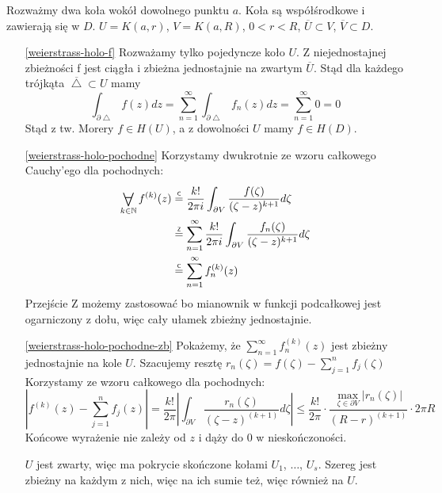 \documentclass[11pt]{article}
\newcommand{\abs}[1]{\left|#1\right|} %
\newcommand{\closure}[1]{\overline{#1}} %
\newcommand{\eqtext}[1]{\overset{\text{\tiny\sffamily #1}}{=}} %
\newcommand{\Forall}[1]{\mathop{\vcenter{\hbox{\LARGE$\forall$}}}\limits_{#1}} %
\theoremstyle{plain}
\theoremstyle{definition}
\theoremstyle{remark}
\let\oldendproof\endproof
\renewenvironment{proof}[1][\proofname]{
  \oldproof[\textsc{\small #1}]
}{\oldendproof}
\begin{document}
\begin{proof}
  Rozważmy dwa koła wokół dowolnego punktu $a$.
  Koła są współśrodkowe i zawierają się w $D$.
  $ U = K(a, r) $, $ V = K(a, R) $, $ 0 < r < R $, $ \closure{U} \subset V $, $ \closure{V} \subset D $.

  \begin{enumerate}

    \item[\ref{weierstrass-holo-f}]
    Rozważamy tylko pojedyncze koło $U$.
    Z niejednostajnej zbieżności f jest ciągła i zbieżna jednostajnie na zwartym $ \closure{U} $.
    Stąd dla każdego trójkąta $ \closure{\bigtriangleup} \subset U $ mamy
    $$
      \int_{\partial \bigtriangleup} f(z)dz =
      \sum_{n=1}^{\infty}\int_{\partial \bigtriangleup} f_n(z)dz =
      \sum_{n=1}^{\infty} 0 =
      0
    $$
    Stąd z tw. Morery $ f \in H(U) $, a z dowolności $ U $ mamy $ f \in H(D) $.

    \item[\ref{weierstrass-holo-pochodne}]
    Korzystamy dwukrotnie ze wzoru całkowego Cauchy'ego dla pochodnych:
    \begin{align*}
      \Forall{k \in \mathbb{N}} f^{(k)}(z) &
      \eqtext{C} \frac{k!}{2 \pi i} \int_{\partial V} \frac{f(\zeta)}{(\zeta - z)^{k+1}} d\zeta \\ &
      \eqtext{Z} \sum_{n=1}^{\infty} \frac{k!}{2 \pi i} \int_{\partial V} \frac{f_n(\zeta)}{(\zeta - z)^{k+1}} d\zeta \\ &
      \eqtext{C} \sum_{n=1}^{\infty} f_n^{(k)}(z)
    \end{align*}
    Przejście Z możemy zastosować bo mianownik w funkcji podcałkowej jest ogarniczony z dołu, więc cały ułamek zbieżny jednostajnie.

    \item[\ref{weierstrass-holo-pochodne-zb}]
    Pokażemy, że $ \sum_{n=1}^{\infty} f_n^{(k)}(z) $ jest zbieżny jednostajnie na kole $U$.
    Szacujemy resztę $ r_n(\zeta) = f(\zeta) - \sum_{j=1}^{n} f_j(\zeta) $
    Korzystamy ze wzoru całkowego dla pochodnych:
    $$
      \abs{ f^{(k)}(z) - \sum_{j=1}^{n} f_j(z) }
      = \frac{k!}{2 \pi} \abs{ \int_{\partial V} \frac{r_n(\zeta)}{(\zeta - z)^{(k+1)}} d\zeta }
      \leq \frac{k!}{2 \pi} \cdot \frac{ \max_{\zeta \in \partial V} \abs{r_n(\zeta)} }{ (R - r)^{(k+1)} } \cdot 2 \pi R
    $$
    Końcowe wyrażenie nie zależy od $z$ i dąży do $0$ w nieskończoności.

    $U$ jest zwarty, więc ma pokrycie skończone kołami $ U_1 $, $ \dots $, $ U_s $.
    Szereg jest zbieżny na każdym z nich, więc na ich sumie też, więc również na $U$.
  \end{enumerate}  
\end{proof}
\end{document}
